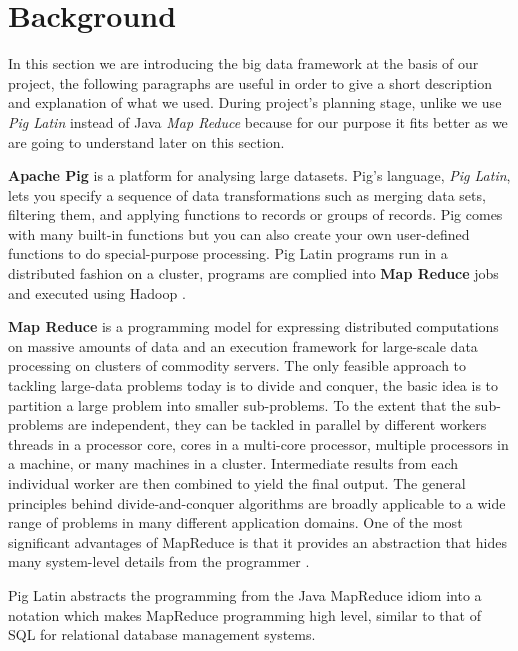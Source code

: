 \section{Background}
In this section we are introducing the big data framework at the basis of our project, the following paragraphs are useful in order to give a short description and explanation of what we used.  
During project's planning stage, unlike \cite{ddos_forensics} we use \textit{Pig Latin} instead of Java \textit{Map Reduce} because for our purpose it fits better as we are going to understand later on this section. 

\textbf{Apache Pig} is a platform for analysing large datasets. Pig's language, \textit{Pig Latin}, lets you specify a sequence of data transformations such as merging data sets, filtering them, and applying functions to records or groups of records. Pig comes with many built-in functions but you can also create your own user-defined functions to do special-purpose processing.
Pig Latin programs run in a distributed fashion on a cluster, programs are complied into \textbf{Map Reduce} jobs and executed using Hadoop \cite{pig_wiki}.

\textbf{Map Reduce} is a programming model for expressing distributed computations on massive amounts of data and an execution framework for large-scale data processing on clusters of commodity servers. The only feasible approach to tackling large-data problems today is to divide and conquer, the basic idea is to partition a large problem into smaller sub-problems. To the extent that the sub-problems are independent, they can be tackled in parallel by different workers  threads in a processor core, cores in a multi-core processor, multiple processors in a machine, or many machines in a cluster. Intermediate results from each individual worker are then combined to yield the final output.
The general principles behind divide-and-conquer algorithms are broadly applicable to a wide range of problems in many different application domains. One of the most significant advantages of MapReduce is that it provides an abstraction that hides many system-level details from the programmer \cite{jimmy_lin}.

Pig Latin abstracts the programming from the Java MapReduce idiom into a notation which makes MapReduce programming high level, similar to that of SQL for relational database management systems.